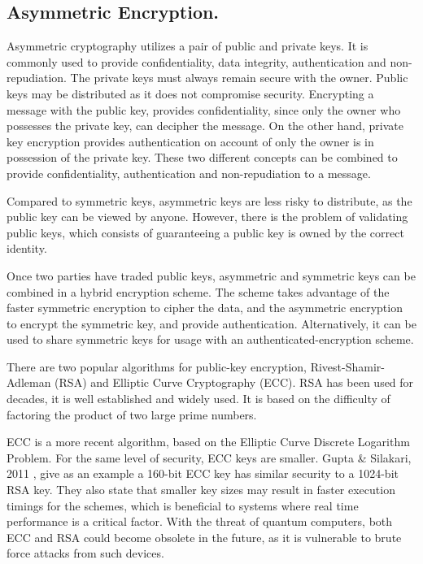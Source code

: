 \subsection{Asymmetric Encryption.}  \label{chap:background:crypto:assymetric}

Asymmetric cryptography utilizes a pair of public and private keys. It is commonly used to provide confidentiality, data integrity, authentication and non-repudiation.
The private keys must always remain secure with the owner. Public keys may be distributed as it does not compromise security. Encrypting a message with the public key, provides confidentiality, since only the owner who possesses the private key, can decipher the message. On the other hand, private key encryption provides authentication on account of only the owner is in possession of the private key. These two different concepts can be combined to provide confidentiality, authentication and non-repudiation to a message.

Compared to symmetric keys, asymmetric keys are less risky to distribute, as the public key can be viewed by anyone. However, there is the problem of validating public keys, which consists of guaranteeing a public key is owned by the correct identity.

Once two parties have traded public keys, asymmetric and symmetric keys can be combined in a hybrid encryption scheme. The scheme takes advantage of the faster symmetric encryption to cipher the data, and the asymmetric encryption to encrypt the symmetric key, and provide authentication. Alternatively, it can be used to share symmetric keys for usage with an authenticated-encryption scheme.

There are two popular algorithms for public-key encryption, Rivest-Shamir-Adleman (RSA) and Elliptic Curve Cryptography (ECC).
RSA has been used for decades, it is well established and widely used. It is based on the difficulty of factoring the product of two large prime numbers.

ECC is a more recent algorithm, based on the Elliptic Curve Discrete Logarithm Problem. For the same level of security, ECC keys are smaller. Gupta \& Silakari, 2011  \cite{eccoverrsa}, give as an example a 160-bit ECC key has similar security to a 1024-bit RSA key. They also state that smaller key sizes may result in faster execution timings for the schemes, which is beneficial to systems where real time performance is a critical factor.
With the threat of quantum computers, both ECC and RSA could become obsolete in the future, as it is vulnerable to brute force attacks from such devices.

